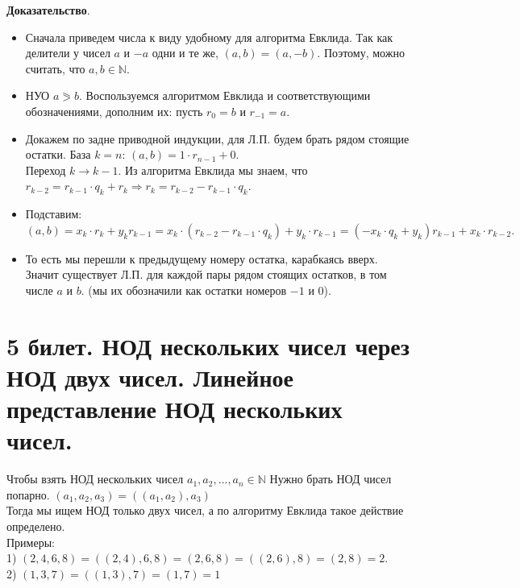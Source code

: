 \documentclass[a4paper, 12pt]{article}
\begin{document}
\textbf{Доказательство}.
\begin{itemize}
	
\item Сначала приведем числа к виду удобному для алгоритма Евклида. Так как делители у чисел $a$ и $-a$ одни и те же, $(a, b) = (a, -b)$. Поэтому, можно считать, что $a, b \in \mathbb{N}$.

\item НУО $a \eqslantgtr b$. Воспользуемся алгоритмом Евклида и
соответствующими обозначениями, дополним их: пусть $r_0 = b$
и $r_{-1} = a$.
\item Докажем по задне приводной индукции, для Л.П. будем брать рядом стоящие остатки.
База $k = n$: $(a, b) = 1 · r_{n-1} + 0$.\\
Переход $k \rightarrow k - 1$. Из алгоритма Евклида мы знаем, что\\
$r_{k-2} = r_{k-1} \cdot q_k + r_{k} \Rightarrow r_k = r_{k-2} - r_{k-1} \cdot q_k.$ 
\item Подставим:\\
$(a, b) = x_k \cdot r_k + y_k r_{k-1} = x_k \cdot (r_{k-2} - r_{k-1} \cdot q_k) + y_k \cdot r_{k-1} =
(-x_k \cdot q_k + y_k)r_{k-1} + x_k \cdot r_{k-2}.$

\item То есть мы перешли к предыдущему номеру остатка, карабкаясь вверх. Значит существует Л.П. для каждой пары рядом стоящих остатков, в том числе $a$ и $b$. (мы их обозначили как остатки номеров $-1$ и $0$). 
\end{itemize}

\section*{5 билет. НОД нескольких чисел через НОД двух чисел. Линейное представление НОД нескольких чисел.}

Чтобы взять НОД нескольких чисел $a_1, a_2, \hdots, a_n \in \mathbb{N}$ Нужно брать НОД чисел попарно. $(a_1, a_2, a_3) = ((a_1, a_2), a_3)$\\

Тогда мы ищем НОД только двух чисел, а по алгоритму Евклида такое действие определено.\\

Примеры:\\ 
1) $(2,4,6,8) = ((2,4), 6, 8) = (2, 6, 8) = ((2,6), 8) = (2, 8) = 2.$
\\
2) $(1,3,7) = ((1,3), 7) = (1, 7) = 1$\\
\end{document}
